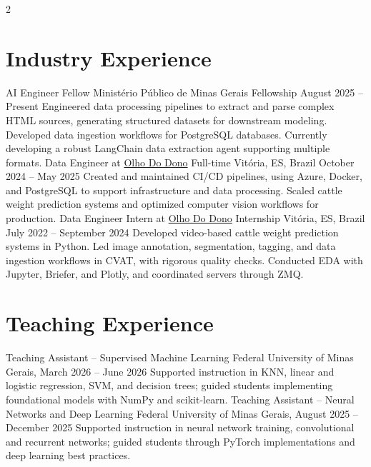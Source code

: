 \begin{multicols}{2}

\section{Industry Experience}
\liststart
\columnindustry
  {AI Engineer Fellow}
  {Ministério Público de Minas Gerais}
  {Fellowship}
  {August 2025 -- Present}
  {Engineered data processing pipelines to extract and parse complex HTML sources, generating structured datasets for downstream modeling. Developed data ingestion workflows for PostgreSQL databases. Currently developing a robust LangChain data extraction agent supporting multiple formats.}
\columnindustry
  {Data Engineer at \href{https://olhododono.agr.br}{Olho Do Dono}}
  {Full-time}
  {Vitória, ES, Brazil}
  {October 2024 -- May 2025}
  {Created and maintained CI/CD pipelines, using Azure, Docker, and PostgreSQL to support infrastructure and data processing. Scaled cattle weight prediction systems and optimized computer vision workflows for production.}
\columnindustry
  {Data Engineer Intern at \href{https://olhododono.agr.br}{Olho Do Dono}}
  {Internship}
  {Vitória, ES, Brazil}
  {July 2022 -- September 2024}
  {Developed video-based cattle weight prediction systems in Python. Led image annotation, segmentation, tagging, and data ingestion workflows in CVAT, with rigorous quality checks. Conducted EDA with Jupyter, Briefer, and Plotly, and coordinated servers through ZMQ.}
\listend

\section{Teaching Experience}
\columnresearch
  {Teaching Assistant -- Supervised Machine Learning}
  {Federal University of Minas Gerais, March 2026 -- June 2026}
  {Supported instruction in KNN, linear and logistic regression, SVM, and decision trees; guided students implementing foundational models with NumPy and scikit-learn.}
  \columnresearch
  {Teaching Assistant -- Neural Networks and Deep Learning}
  {Federal University of Minas Gerais, August 2025 -- December 2025}
  {Supported instruction in neural network training, convolutional and recurrent networks; guided students through PyTorch implementations and deep learning best practices.}


\end{multicols}

